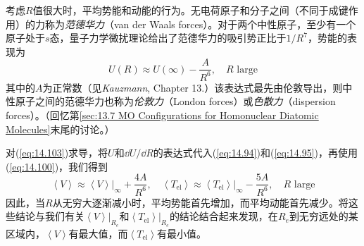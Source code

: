     考虑$R$值很大时，平均势能和动能的行为。无电荷原子和分子之间（不同于成键作用）的力称为\textit{范德华力}（van der Waals forces）。对于两个中性原子，至少有一个原子处于$s$态，量子力学微扰理论给出了范德华力的吸引势正比于$1/R^7$，势能的表现为
    \begin{equation}
        U \left(R\right) \approx U\left(\infty\right) - \frac{A}{R^6}, \quad R \text{ large}
        \label{eq:14.103}
    \end{equation}
    其中的$A$为正常数（见\textit{Kauzmann}, Chapter 13.）该表达式最先由伦敦导出，则中性原子之间的范德华力也称为\textit{伦敦力}（London forces）或\textit{色散力}（dispersion forces）。（回忆第\ref{sec:13.7 MO Configurations for Homonuclear Diatomic Molecules}末尾的讨论。）

    对(\ref{eq:14.103})求导，将$U$和$\dd U/\dd R$的表达式代入(\ref{eq:14.94})和(\ref{eq:14.95})，再使用(\ref{eq:14.100})，我们得到
    \begin{equation}
        \left\langle V \right\rangle \approx \left. \left\langle V \right\rangle \right|_{\infty} + \frac{4A}{R^6}, \quad \left\langle T_{\text{el}} \right\rangle \approx \left. \left\langle T_{\text{el}} \right\rangle \right|_{\infty} - \frac{5A}{R^6}, \quad R \text{ large}
        \label{eq:14.104}
    \end{equation}
    因此，当$R$从无穷大逐渐减小时，平均势能首先增加，而平均动能首先减少。将这些结论与我们有关$\left. \left\langle V \right\rangle \right|_{R_e}$和$\left. \left\langle T_{\text{el}} \right\rangle \right|_{R_e}$的结论结合起来发现，在$R_e$到无穷远处的某区域内，$\left\langle V \right\rangle$有最大值，而$\left\langle T_{\text{el}} \right\rangle$有最小值。

